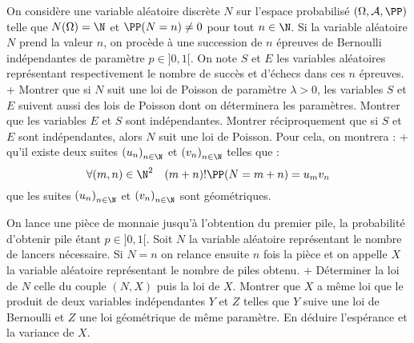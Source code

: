 
\def\TR{\mathcal T}
\def\PO{\mathcal P(\Omega)}
\def\OTR{(\Omega,\TR)}

\def\bltsi{{\color{tcbcolbacktitle}\bullet\;}}
\def\bltalors{{\color{tcbcolbacktitle}\diamond\;}}

\def\bfone{\OPN{\mathbf 1}}




\begin{exercise}[title=Une caractérisation de la loi de Poisson] 
On considère une variable aléatoire discrète $N$ sur l'espace probabilisé $(\Omega, \mathcal{A}, \PP)$ telle que $N(\Omega)=\N$ et $\PP(N=n) \neq 0$ pour tout $n \in \N$. Si la variable aléatoire $N$ prend la valeur $n$, on procède à une succession de $n$ épreuves de Bernoulli indépendantes de paramètre $p \in] 0,1[$. On note $S$ et $E$ les variables aléatoires représentant respectivement le nombre de succès et d'échecs dans ces $n$ épreuves.
\question+ Montrer que si $N$ suit une loi de Poisson de paramètre $\lambda>0$, les variables $S$ et $E$ suivent aussi des lois de Poisson dont on déterminera les paramètres. Montrer que les variables $E$ et $S$ sont indépendantes.
\question Montrer réciproquement que si $S$ et $E$ sont indépendantes, alors $N$ suit une loi de Poisson. Pour cela, on montrera :
\question+ qu'il existe deux suites $\left(u_{n}\right)_{n \in \N}$ et $\left(v_{n}\right)_{n \in \N}$ telles que :
\begin{equation*}
\forall(m, n) \in \N^{2} \quad(m+n) ! \PP(N=m+n)=u_{m} v_{n}
\end{equation*}
\question que les suites $\left(u_{n}\right)_{n \in \N}$ et $\left(v_{n}\right)_{n \in \N}$ sont géométriques.
\endquestions 
\end{exercise}

\begin{exercise}
On lance une pièce de monnaie jusqu'à l'obtention du premier pile, la probabilité d'obtenir pile étant $p \in] 0,1[$. Soit $N$ la variable aléatoire représentant le nombre de lancers nécessaire. Si $N=n$ on relance ensuite $n$ fois la pièce et on appelle $X$ la variable aléatoire représentant le nombre de piles obtenu.
\question+ Déterminer la loi de $N$ celle du couple $(N, X)$ puis la loi de $X$.
\question Montrer que $X$ a même loi que le produit de deux variables indépendantes $Y$ et $Z$ telles que $Y$ suive une loi de Bernoulli et $Z$ une loi géométrique de même paramètre.
\question En déduire l'espérance et la variance de $X$.
\endquestions 
\end{exercise}


